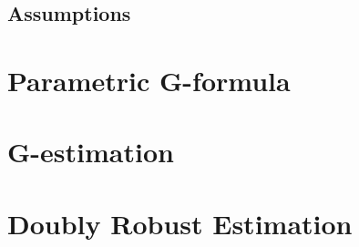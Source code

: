\subsection{Assumptions} 




\section{Parametric G-formula} 

\section{G-estimation} 

\section{Doubly Robust Estimation} 




